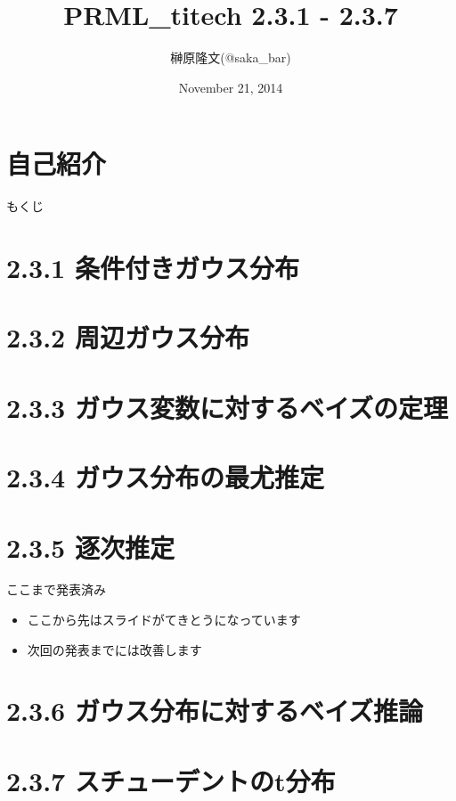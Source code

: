 \documentclass[dvipdfm]{beamer}
\title{PRML\_titech 2.3.1 - 2.3.7}
\author{榊原隆文(@saka\_bar)}
\date{November 21, 2014}
\begin{document}
\maketitle

 \section*{自己紹介}
 

 \begin{frame}{もくじ}
  \tableofcontents
 \end{frame}

 \section{2.3.1 条件付きガウス分布}
 

 \section{2.3.2 周辺ガウス分布}
 

 \section{2.3.3 ガウス変数に対するベイズの定理}
 

 \section{2.3.4 ガウス分布の最尤推定}
 

 \section{2.3.5 逐次推定}
 

\begin{frame}{ここまで発表済み}
\begin{itemize}
 \item ここから先はスライドがてきとうになっています
 \item 次回の発表までには改善します
\end{itemize}
\end{frame}

 \section{2.3.6 ガウス分布に対するベイズ推論}
 

 \section{2.3.7 スチューデントのt分布}
 
\end{document}

